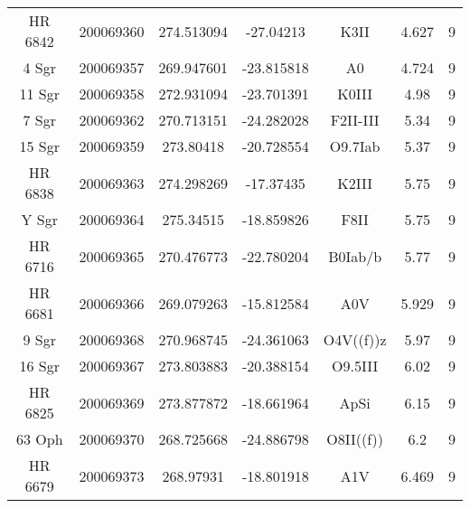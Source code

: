 \begin{table*}
\begin{tabular}{ccccccc}
HR 6842 & 200069360 & 274.513094 & -27.04213 & K3II & 4.627 & 9 \\
4 Sgr & 200069357 & 269.947601 & -23.815818 & A0 & 4.724 & 9 \\
11 Sgr & 200069358 & 272.931094 & -23.701391 & K0III & 4.98 & 9 \\
7 Sgr & 200069362 & 270.713151 & -24.282028 & F2II-III & 5.34 & 9 \\
15 Sgr & 200069359 & 273.80418 & -20.728554 & O9.7Iab & 5.37 & 9 \\
HR 6838 & 200069363 & 274.298269 & -17.37435 & K2III & 5.75 & 9 \\
Y Sgr & 200069364 & 275.34515 & -18.859826 & F8II & 5.75 & 9 \\
HR 6716 & 200069365 & 270.476773 & -22.780204 & B0Iab/b & 5.77 & 9 \\
HR 6681 & 200069366 & 269.079263 & -15.812584 & A0V & 5.929 & 9 \\
9 Sgr & 200069368 & 270.968745 & -24.361063 & O4V((f))z & 5.97 & 9 \\
16 Sgr & 200069367 & 273.803883 & -20.388154 & O9.5III & 6.02 & 9 \\
HR 6825 & 200069369 & 273.877872 & -18.661964 & ApSi & 6.15 & 9 \\
63 Oph & 200069370 & 268.725668 & -24.886798 & O8II((f)) & 6.2 & 9 \\
HR 6679 & 200069373 & 268.97931 & -18.801918 & A1V & 6.469 & 9 \\
\hline
\end{tabular}
\end{table*}
